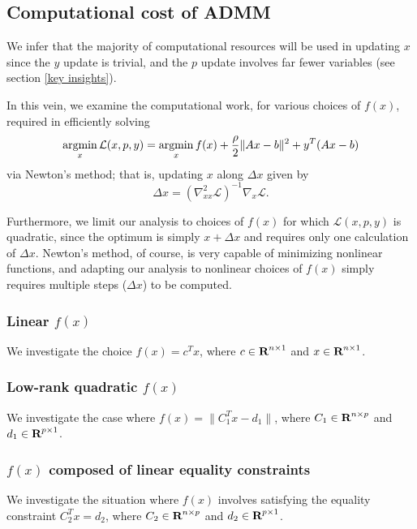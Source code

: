 \documentclass{article}
\begin{document}
\subsection{Computational cost of ADMM}
We infer that the majority of computational resources 
    will be used in updating $x$ since
    the $y$ update is trivial, and
    the $p$ update involves far fewer variables 
    (see section \ref{key insights}).

In this vein, we examine the computational work, for various choices of $f(x)$,
    required in efficiently solving
    \begin{equation}
    \mathop{\rm argmin}_x \mathcal{L}(x,p,y) = 
        \mathop{\rm argmin}_x f(x) + \frac{\rho}{2}\|Ax - b\|^2 + y^T(Ax - b)
    \end{equation}
    via Newton's method; that is, updating $x$ along $\Delta x$ given by
    \begin{equation}
    \Delta x = (\nabla_{xx}^2 \mathcal{L})^{-1} \nabla_x \mathcal{L}.
    \end{equation}

Furthermore, we limit our analysis to choices of $f(x)$ for which 
    $\mathcal{L}(x,p,y)$ is quadratic,
    since the optimum is simply $x + \Delta x$ and
    requires only one calculation of $\Delta x$.
Newton's method, of course, is very capable of minimizing nonlinear functions,
    and adapting our analysis to nonlinear choices of $f(x)$ 
    simply requires multiple steps ($\Delta x$) to be computed.

\subsubsection{Linear $f(x)$}
We investigate the choice $f(x) = c^T x$, 
    where $c \in {\mbox{\bf R}}^{n \times 1}$
    and $x \in {\mbox{\bf R}}^{n \times 1}$.

\subsubsection{Low-rank quadratic $f(x)$}
We investigate the case where $f(x) = \|C_1^T x - d_1\|$,
    where $C_1 \in {\mbox{\bf R}}^{n \times p}$
    and $d_1 \in {\mbox{\bf R}}^{p \times 1}$.

\subsubsection{$f(x)$ composed of linear equality constraints}
We investigate the situation where $f(x)$ involves
    satisfying the equality constraint $C_2^T x = d_2$,
    where $C_2 \in {\mbox{\bf R}}^{n \times p}$
    and $d_2 \in {\mbox{\bf R}}^{p \times 1}$.
\end{document}

